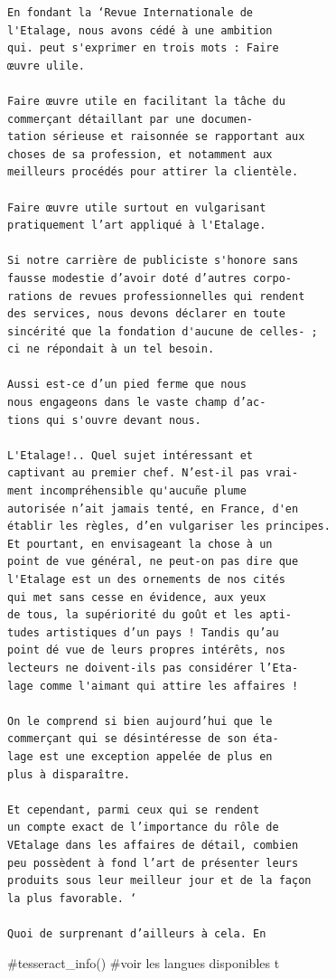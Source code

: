 \documentclass[
  letterpaper,
  DIV=11,
  numbers=noendperiod]{scrreprt}
\newenvironment{Shaded}{\begin{snugshade}}{\end{snugshade}}
\newcommand{\CommentTok}[1]{\textcolor[rgb]{0.37,0.37,0.37}{#1}}
\newcommand{\NormalTok}[1]{\textcolor[rgb]{0.00,0.23,0.31}{#1}}
\begin{document}
\begin{verbatim}
En fondant la ‘Revue Internationale de
l'Etalage, nous avons cédé à une ambition
qui. peut s'exprimer en trois mots : Faire
œuvre ulile.

Faire œuvre utile en facilitant la tâche du
commerçant détaillant par une documen-
tation sérieuse et raisonnée se rapportant aux
choses de sa profession, et notamment aux
meilleurs procédés pour attirer la clientèle.

Faire œuvre utile surtout en vulgarisant
pratiquement l’art appliqué à l'Etalage.

Si notre carrière de publiciste s'honore sans
fausse modestie d’avoir doté d’autres corpo-
rations de revues professionnelles qui rendent
des services, nous devons déclarer en toute
sincérité que la fondation d'aucune de celles- ;
ci ne répondait à un tel besoin.

Aussi est-ce d’un pied ferme que nous
nous engageons dans le vaste champ d’ac-
tions qui s'ouvre devant nous.

L'Etalage!.. Quel sujet intéressant et
captivant au premier chef. N’est-il pas vrai-
ment incompréhensible qu'aucuñe plume
autorisée n’ait jamais tenté, en France, d'en
établir les règles, d’en vulgariser les principes.
Et pourtant, en envisageant la chose à un
point de vue général, ne peut-on pas dire que
l'Etalage est un des ornements de nos cités
qui met sans cesse en évidence, aux yeux
de tous, la supériorité du goût et les apti-
tudes artistiques d’un pays ! Tandis qu’au
point dé vue de leurs propres intérêts, nos
lecteurs ne doivent-ils pas considérer l’Eta-
lage comme l'aimant qui attire les affaires !

On le comprend si bien aujourd’hui que le
commerçant qui se désintéresse de son éta-
lage est une exception appelée de plus en
plus à disparaître.

Et cependant, parmi ceux qui se rendent
un compte exact de l’importance du rôle de
VEtalage dans les affaires de détail, combien
peu possèdent à fond l’art de présenter leurs
produits sous leur meilleur jour et de la façon
la plus favorable. ‘

Quoi de surprenant d’ailleurs à cela. En
\end{verbatim}

\begin{Shaded}
\begin{Highlighting}[]
\CommentTok{\#tesseract\_info() \#voir les langues disponibles}
\NormalTok{t}
\end{Highlighting}
\end{Shaded}
\end{document}
